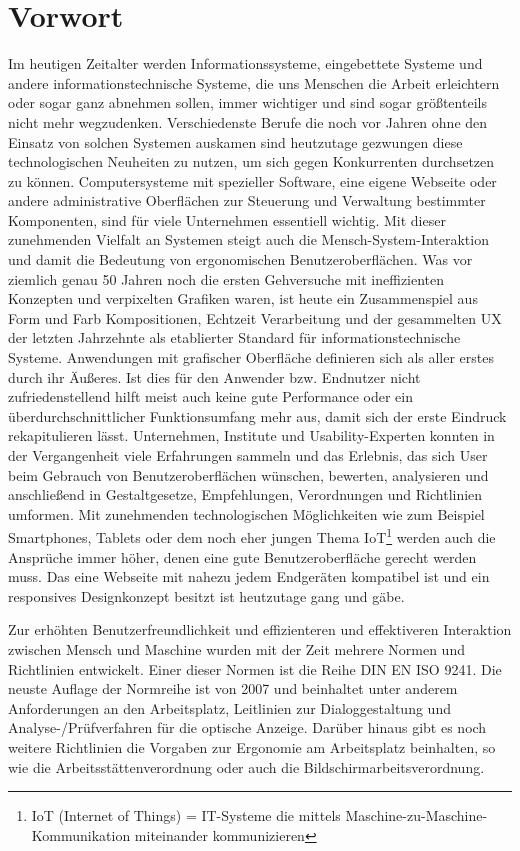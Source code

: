 \section{Vorwort}

Im heutigen Zeitalter werden Informationssysteme, eingebettete Systeme und andere informationstechnische Systeme, die uns Menschen die Arbeit erleichtern oder sogar ganz abnehmen sollen, immer wichtiger und sind sogar größtenteils nicht mehr wegzudenken. Verschiedenste Berufe die noch vor Jahren ohne den Einsatz von solchen Systemen auskamen sind heutzutage gezwungen diese technologischen Neuheiten zu nutzen, um sich gegen Konkurrenten durchsetzen zu können. Computersysteme mit spezieller Software, eine eigene Webseite oder andere administrative Oberflächen zur Steuerung und Verwaltung bestimmter Komponenten, sind für viele Unternehmen essentiell wichtig. Mit dieser zunehmenden Vielfalt an Systemen steigt auch die Mensch-System-Interaktion und damit die Bedeutung von ergonomischen Benutzeroberflächen. Was vor ziemlich genau 50 Jahren noch die ersten Gehversuche mit ineffizienten Konzepten und verpixelten Grafiken waren, ist heute ein Zusammenspiel aus Form und Farb Kompositionen, Echtzeit Verarbeitung und der gesammelten UX der letzten Jahrzehnte als etablierter Standard für informationstechnische Systeme. Anwendungen mit grafischer Oberfläche definieren sich als aller erstes durch ihr Äußeres. Ist dies für den Anwender bzw. Endnutzer nicht zufriedenstellend hilft meist auch keine gute Performance oder ein überdurchschnittlicher Funktionsumfang mehr aus, damit sich der erste Eindruck rekapitulieren lässt. Unternehmen, Institute und Usability-Experten konnten in der Vergangenheit viele Erfahrungen sammeln und das Erlebnis, das sich User beim Gebrauch von Benutzeroberflächen wünschen, bewerten, analysieren und anschließend in Gestaltgesetze, Empfehlungen, Verordnungen und Richtlinien umformen. Mit zunehmenden technologischen Möglichkeiten wie zum Beispiel Smartphones, Tablets oder dem noch eher jungen Thema IoT\footnote{IoT (Internet of Things) = IT-Systeme die mittels Maschine-zu-Maschine-Kommunikation miteinander kommunizieren} werden auch die Ansprüche immer höher, denen eine gute Benutzeroberfläche gerecht werden muss. Das eine Webseite mit nahezu jedem Endgeräten kompatibel ist und ein responsives Designkonzept besitzt ist heutzutage gang und gäbe.

Zur erhöhten Benutzerfreundlichkeit und effizienteren und effektiveren Interaktion zwischen Mensch und Maschine wurden mit der Zeit mehrere Normen und Richtlinien entwickelt. Einer dieser Normen ist die Reihe DIN EN ISO 9241. Die neuste Auflage der Normreihe ist von 2007 und beinhaltet unter anderem Anforderungen an den Arbeitsplatz, Leitlinien zur Dialoggestaltung und Analyse-/Prüfverfahren für die optische Anzeige. Darüber hinaus gibt es noch weitere Richtlinien die Vorgaben zur Ergonomie am Arbeitsplatz beinhalten, so wie die Arbeitsstättenverordnung oder auch die Bildschirmarbeitsverordnung.

